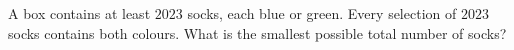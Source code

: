 A box contains at least $2023$ socks, each blue or green. Every selection of $2023$ socks contains both colours. What is the smallest possible total number of socks?

